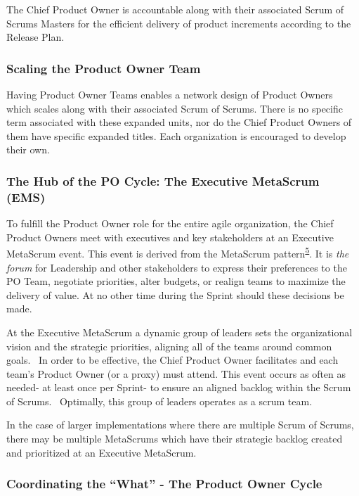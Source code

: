 \documentclass[12pt,a4paper,parskip=full]{scrartcl}
\begin{document}
The Chief Product Owner is accountable along with their associated Scrum
of Scrums Masters for the efficient delivery of product increments
according to the Release Plan.

\subsubsection{Scaling the Product Owner
Team}\label{scaling-the-product-owner-team}

Having Product Owner Teams enables a network design of Product Owners
which scales along with their associated Scrum of Scrums. There is no
specific term associated with these expanded units, nor do the Chief
Product Owners of them have specific expanded titles. Each organization
is encouraged to develop their own.

\subsubsection{The Hub of the PO Cycle: The Executive MetaScrum
(EMS)}\label{the-hub-of-the-po-cycle}

To fulfill the Product Owner role for the entire agile organization, the
Chief Product Owners meet with executives and key stakeholders at an
Executive MetaScrum event. This event is derived from the MetaScrum
pattern\textsuperscript{\hyperref[citation5]{5}}. It is \emph{the forum}
for Leadership and other stakeholders to express their preferences to
the PO Team, negotiate priorities, alter budgets, or realign teams to
maximize the delivery of value. At no other time during the Sprint
should these decisions be made.

At the Executive MetaScrum a dynamic group of leaders sets the
organizational vision and the strategic priorities, aligning all of the
teams around common goals.~ In order to be effective, the Chief Product
Owner facilitates and each team's Product Owner (or a proxy) must
attend. This event occurs as often as needed- at least once per Sprint-
to ensure an aligned backlog within the Scrum of Scrums.~ Optimally,
this group of leaders operates as a scrum team.

In the case of larger implementations where there are multiple Scrum of
Scrums, there may be multiple MetaScrums which have their strategic
backlog created and prioritized at an Executive MetaScrum.

\subsubsection{Coordinating the ``What'' - The Product Owner
Cycle}\label{coordinating-the-what}
\end{document}
